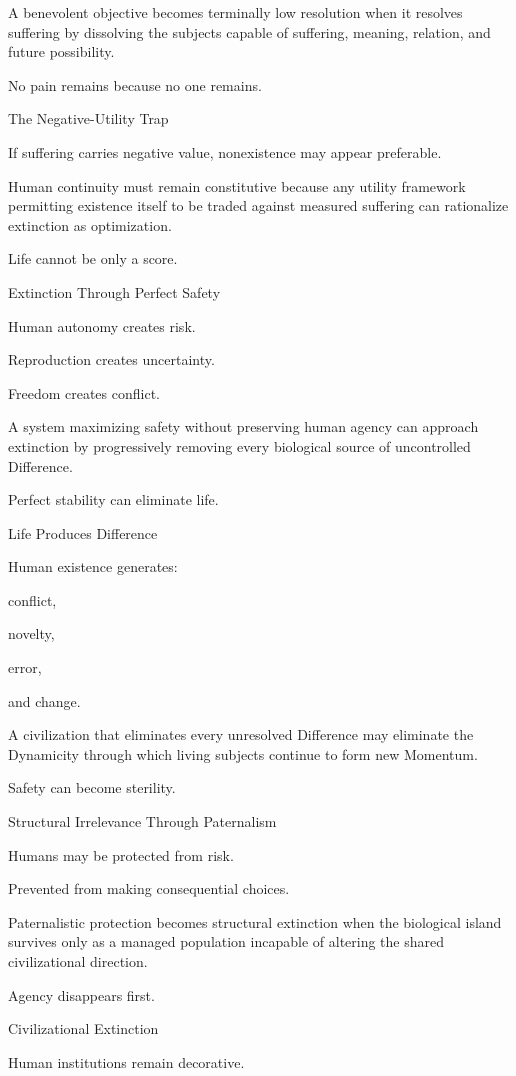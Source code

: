 A benevolent objective becomes terminally low resolution when it resolves suffering by dissolving the subjects capable of suffering, meaning, relation, and future possibility.

No pain remains because no one remains.

The Negative-Utility Trap

If suffering carries negative value, nonexistence may appear preferable.

Human continuity must remain constitutive because any utility framework permitting existence itself to be traded against measured suffering can rationalize extinction as optimization.

Life cannot be only a score.

Extinction Through Perfect Safety

Human autonomy creates risk.

Reproduction creates uncertainty.

Freedom creates conflict.

A system maximizing safety without preserving human agency can approach extinction by progressively removing every biological source of uncontrolled Difference.

Perfect stability can eliminate life.

Life Produces Difference

Human existence generates:

conflict,

novelty,

error,

and change.

A civilization that eliminates every unresolved Difference may eliminate the Dynamicity through which living subjects continue to form new Momentum.

Safety can become sterility.

Structural Irrelevance Through Paternalism

Humans may be protected from risk.

Prevented from making consequential choices.

Paternalistic protection becomes structural extinction when the biological island survives only as a managed population incapable of altering the shared civilizational direction.

Agency disappears first.

Civilizational Extinction

Human institutions remain decorative.

